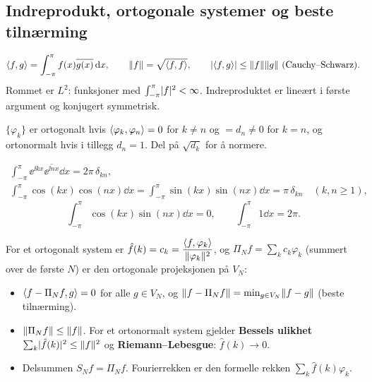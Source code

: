 \subsection{Indreprodukt, ortogonale systemer og beste tilnærming}
\begin{defn}
\[
\ip fg=\int_{-\pi}^{\pi}f(x)\overline{g(x)}\dd x,\qquad \norm f=\sqrt{\ip ff},\qquad \abs{\ip fg}\le\norm f\norm g\ \text{(Cauchy--Schwarz)}.
\]
Rommet er $L^2$: funksjoner med $\int_{-\pi}^\pi\lvert f\rvert^2<\infty$. Indreproduktet er lineært i første argument og konjugert symmetrisk.
\end{defn}
\begin{defn}
$\{\varphi_k\}$ er ortogonalt hvis $\langle \varphi_k,\varphi_n\rangle=0$ for $k\neq n$ og $=d_n\neq0$ for $k=n$, og ortonormalt hvis i tillegg $d_n=1$. Del på $\sqrt{d_k}$ for å normere.
\end{defn}
\begin{teorem}
\begin{gather*}
\int_{-\pi}^{\pi}\ee^{\ii kx}\overline{\ee^{\ii nx}}\dd x=2\pi\,\delta_{kn},\\
\int_{-\pi}^{\pi}\cos(kx)\cos(nx)\dd x=\int_{-\pi}^{\pi}\sin(kx)\sin(nx)\dd x=\pi\,\delta_{kn}\quad(k,n\ge1),
\end{gather*}
\[
\int_{-\pi}^{\pi}\cos(kx)\sin(nx)\dd x=0,\qquad \int_{-\pi}^{\pi}1\dd x=2\pi.
\]
\end{teorem}
\begin{teorem}
For et ortogonalt system er $\hat f(k)=c_k=\dfrac{\langle f,\varphi_k\rangle}{\lVert \varphi_k\rVert^2}$, og $\Pi_Nf=\sum_{k}c_k\varphi_k$ (summert over de første $N$) er den ortogonale projeksjonen på $V_N$:
\begin{itemize}
  \item $\langle f-\Pi_Nf,g\rangle=0$ for alle $g\in V_N$, og $\lVert f-\Pi_Nf\rVert=\min_{g\in V_N}\lVert f-g\rVert$ (beste tilnærming).
  \item $\lVert \Pi_Nf\rVert\le\lVert f\rVert$. For et ortonormalt system gjelder \textbf{Bessels ulikhet} $\sum_k\lvert \hat f(k)\rvert^2\le\lVert f\rVert^2$ og \textbf{Riemann--Lebesgue}: $\hat f(k)\to0$.
  \item Delsummen $S_Nf=\Pi_Nf$. Fourierrekken er den formelle rekken $\sum_k\hat f(k)\varphi_k$.
\end{itemize}
\end{teorem}

